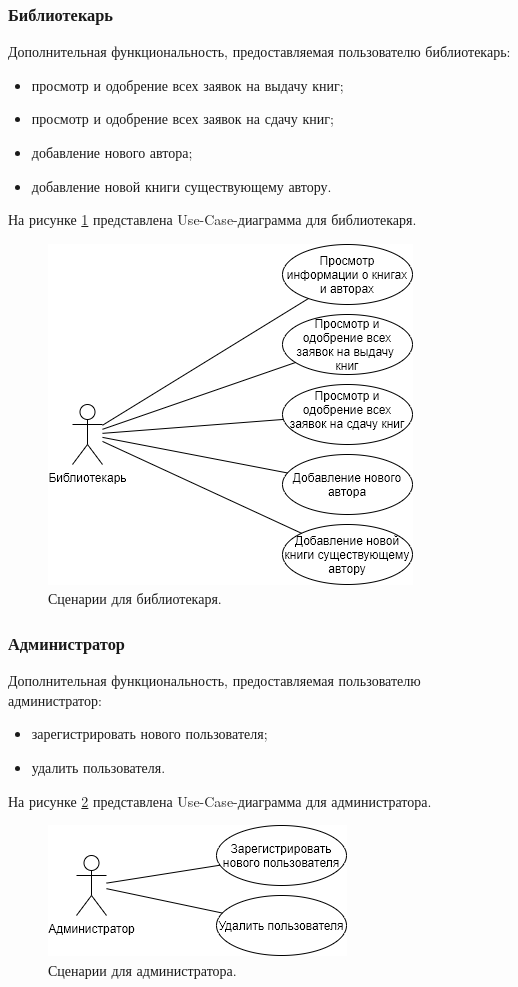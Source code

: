 \subsubsection{Библиотекарь}
Дополнительная функциональность, предоставляемая пользователю библиотекарь:
\begin{itemize}
	\item[1)] просмотр и одобрение всех заявок на выдачу книг;
	\item[2)] просмотр и одобрение всех заявок на сдачу книг; 
	\item[3)] добавление нового автора;
	\item[4)] добавление новой книги существующему автору.    
\end{itemize}
На рисунке \ref{img:UseCaseLibrarian} представлена Use-Case-диаграмма для библиотекаря.
\begin{figure}[h!]
	\centering
	\includegraphics[scale=1]{img/UseCaseLibrarian.png}
	\caption{Сценарии для библиотекаря.}
	\label{img:UseCaseLibrarian}
\end{figure}
\clearpage

\subsubsection{Администратор}
Дополнительная функциональность, предоставляемая пользователю администратор:
\begin{itemize}
	\item[1)] зарегистрировать нового пользователя;
	\item[2)] удалить пользователя.  
\end{itemize}
На рисунке \ref{img:UseCaseAdmin} представлена Use-Case-диаграмма для администратора.
\begin{figure}[h!]
	\centering
	\includegraphics[scale=1]{img/UseCaseAdmin.png}
	\caption{Сценарии для администратора.}
	\label{img:UseCaseAdmin}
\end{figure}
\newpage

